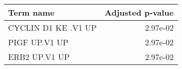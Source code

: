 \begin{tabular}{lr}
\toprule
          Term name &  Adjusted p-value \\
\midrule
CYCLIN D1 KE .V1 UP &          2.97e-02 \\
      PIGF UP.V1 UP &          2.97e-02 \\
      ERB2 UP.V1 UP &          2.97e-02 \\
\bottomrule
\end{tabular}
